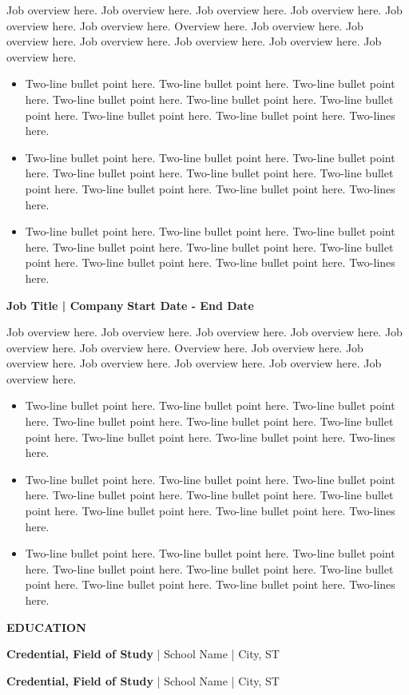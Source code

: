 \documentclass[11pt,letterpaper]{article}
\newcommand{\headertext}[1]{\begin{center}\textbf{\large #1}\end{center}}
\begin{document}
\vspace{0.1cm}
\small{Job overview here. Job overview here. Job overview here. Job overview here. Job overview here. Job overview here. Overview here. Job overview here. Job overview here. Job overview here. Job overview here. Job overview here. Job overview here.}

\begin{itemize}[leftmargin=*, itemsep=0pt, parsep=0pt]
    \item Two-line bullet point here. Two-line bullet point here. Two-line bullet point here. Two-line bullet point here. Two-line bullet point here. Two-line bullet point here. Two-line bullet point here. Two-line bullet point here. Two-lines here.
    \item Two-line bullet point here. Two-line bullet point here. Two-line bullet point here. Two-line bullet point here. Two-line bullet point here. Two-line bullet point here. Two-line bullet point here. Two-line bullet point here. Two-lines here.
    \item Two-line bullet point here. Two-line bullet point here. Two-line bullet point here. Two-line bullet point here. Two-line bullet point here. Two-line bullet point here. Two-line bullet point here. Two-line bullet point here. Two-lines here.
\end{itemize}

\vspace{0.3cm}

\noindent\textbf{Job Title | Company} \hfill \textbf{Start Date - End Date}

\vspace{0.1cm}
\small{Job overview here. Job overview here. Job overview here. Job overview here. Job overview here. Job overview here. Overview here. Job overview here. Job overview here. Job overview here. Job overview here. Job overview here. Job overview here.}

\begin{itemize}[leftmargin=*, itemsep=0pt, parsep=0pt]
    \item Two-line bullet point here. Two-line bullet point here. Two-line bullet point here. Two-line bullet point here. Two-line bullet point here. Two-line bullet point here. Two-line bullet point here. Two-line bullet point here. Two-lines here.
    \item Two-line bullet point here. Two-line bullet point here. Two-line bullet point here. Two-line bullet point here. Two-line bullet point here. Two-line bullet point here. Two-line bullet point here. Two-line bullet point here. Two-lines here.
    \item Two-line bullet point here. Two-line bullet point here. Two-line bullet point here. Two-line bullet point here. Two-line bullet point here. Two-line bullet point here. Two-line bullet point here. Two-line bullet point here. Two-lines here.
\end{itemize}

\vspace{0.5cm}

\headertext{EDUCATION}

\vspace{0.2cm}

\noindent\textbf{Credential, Field of Study} | School Name | City, ST

\vspace{0.1cm}

\noindent\textbf{Credential, Field of Study} | School Name | City, ST
\end{document}
